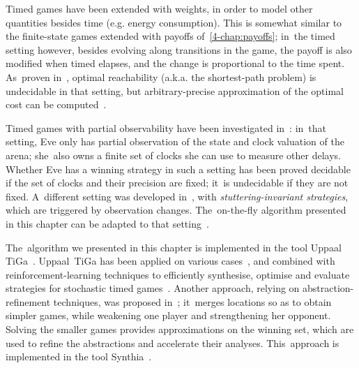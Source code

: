 Timed games have been extended with weights, in order to model other
quantities besides time (e.g. energy consumption). This is somewhat
similar to the finite-state games extended with payoffs
of~\cref{4-chap:payoffs}; in~the timed setting however, besides evolving
along transitions in the game, the payoff is also modified when timed
elapses, and the change is proportional to the time spent. As~proven
in~\cite{BBR05,BBM06}, optimal reachability (a.k.a. the shortest-path
problem) is undecidable in that setting, but arbitrary-precise
approximation of the optimal cost can be computed~\cite{BJM15}.


Timed games with partial observability have been investigated
in~\cite{BDMP03}: in~that setting, Eve only has partial observation
of the state and clock valuation of the arena; she~also owns a finite
set of clocks she can use to measure other delays. Whether Eve has a
winning strategy in such a setting has been proved decidable if the
set of clocks and their precision are fixed; it~is undecidable if they
are not fixed.
%
A~different setting was developed in~\cite{CDLLR07}, with
\emph{stuttering-invariant strategies}, which are triggered by
observation changes. The~on-the-fly algorithm presented in this
chapter can be adapted to that setting~\cite{CDLLR07}. 

The~algorithm we presented in this chapter is implemented in the tool
Uppaal TiGa~\cite{BCD+07}. Uppaal~TiGa has been applied on various
cases~\cite{CJLRR09,Sor14}, and combined with
reinforcement-learning techniques to efficiently synthesise, optimise
and evaluate strategies for stochastic timed games~\cite{DJLMT15}.
%
Another approach, relying on
abstraction-refinement techniques, was proposed in~\cite{EMP10};
it~merges locations so as to obtain simpler games, while weakening one
player and strengthening her opponent. Solving the smaller games
provides approximations on the winning set, which are used to refine
the abstractions and accelerate their analyses. This~approach is
implemented in the tool Synthia~\cite{PEM11}.


